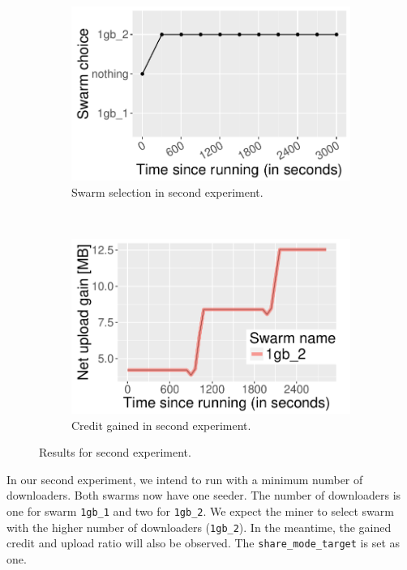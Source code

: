 \begin{figure}[h]
	\begin{subfigure}[t]{0.5\textwidth}
		\centering
		\includegraphics[width=\textwidth]{pics/results/valgain0.pdf}
		\caption{Swarm selection in second experiment.}
		\label{fig:val0gain}
	\end{subfigure}
	~
	\begin{subfigure}[t]{0.5\textwidth}
		\centering
		\includegraphics[width=\textwidth]{pics/results/valgain.pdf}
		\caption{Credit gained in second experiment.}
		\label{fig:vgain}
	\end{subfigure}
	\caption{Results for second experiment.}
\end{figure}

In our second experiment, we intend to run with a minimum number of downloaders. Both swarms now have one seeder. The number of downloaders is one for swarm \texttt{1gb\_1} and two  for \texttt{1gb\_2}. We expect the miner to select swarm with the higher number of downloaders (\texttt{1gb\_2}). In the meantime, the  gained credit and upload ratio will also be observed. The \texttt{share\_mode\_target} is set as one.

